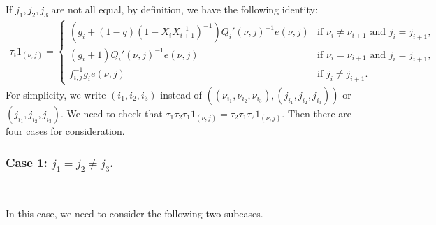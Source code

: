 \documentclass[11pt, reqno]{amsart} \textwidth=14.9cm \oddsidemargin=1cm \evensidemargin=1cm
\theoremstyle{definition}
\numberwithin{equation}{section}
\begin{document}
If $j_1, j_2, j_3$ are not all equal, by definition, we have the following identity:\vspace{0.1cm}
\begin{align*}
\tau_{i}1_{(\nu, j)}=\left\{
\begin{array}{ll}
(g_{i}+(1-q)(1-X_{i}X_{i+1}^{-1})^{-1})Q_{i}'(\nu, j)^{-1}e(\nu, j)&\text{if $\nu_{i}\neq \nu_{i+1}$ and $j_{i}=j_{i+1}$},\\[0.3em]
(g_{i}+1)Q_{i}'(\nu, j)^{-1}e(\nu, j)&\text{if $\nu_{i}=\nu_{i+1}$ and $j_{i}=j_{i+1}$},\\[0.3em]
f_{i, j}^{-1}g_{i}e(\nu, j)&\text{if $j_{i}\neq j_{i+1}$.}
\end{array}
\right.
\end{align*}\vspace{0.2cm}
For simplicity, we write $(i_1, i_2, i_3)$ instead of $((\nu_{i_1}, \nu_{i_2}, \nu_{i_3}),(j_{i_1}, j_{i_2}, j_{i_3}))$ or $(j_{i_1}, j_{i_2}, j_{i_3}).$ We need to check that $\tau_{1}\tau_{2}\tau_{1}1_{(\nu, j)}=\tau_{2}\tau_{1}\tau_{2}1_{(\nu, j)}.$ Then there are four cases for consideration.
\subsubsection*{Case 1: $j_1=j_2\neq j_3$.}

\

\vspace{0.35cm}\noindent  In this case, we need to consider the following two subcases.
\end{document}
